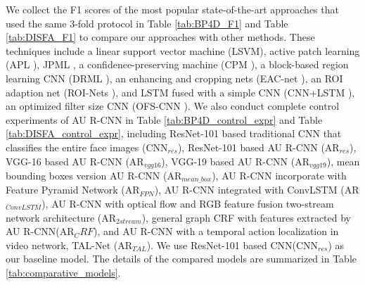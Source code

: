 \documentclass[5p,twocolumn]{elsarticle}
\begin{document}
We collect the F1 scores of the most popular state-of-the-art approaches that used the same 3-fold protocol in Table \ref{tab:BP4D_F1} and Table \ref{tab:DISFA_F1} to compare our approaches with other methods. These techniques include a linear support vector machine (LSVM), active patch learning (APL \cite{zhong2015learning}), JPML \cite{Zhao2016}, a confidence-preserving machine (CPM \cite{zeng2015confidence}), a block-based region learning CNN (DRML \cite{Zhao2016b}), an enhancing and
cropping nets (EAC-net \cite{li2017eac}), an ROI adaption net (ROI-Nets \cite{li2017action}), and LSTM fused with a simple CNN (CNN+LSTM \cite{Chu2017Learning}), an optimized filter size CNN (OFS-CNN \cite{han2017optimizing}). We also conduct complete control experiments of AU R-CNN in Table \ref{tab:BP4D_control_expr} and Table \ref{tab:DISFA_control_expr}, including ResNet-101 based traditional CNN that classifies the entire face images (CNN$_{res}$), ResNet-101 based AU R-CNN (AR$_{res}$), VGG-16 based AU R-CNN (AR$_{vgg16}$), VGG-19 based AU R-CNN (AR$_{vgg19}$), mean bounding boxes version AU R-CNN (AR$_{mean\_box}$), AU R-CNN incorporate with Feature Pyramid Network \cite{lin2017feature}(AR$_{FPN}$), AU R-CNN integrated with ConvLSTM \cite{xingjian2015convolutional} (AR$_{ConvLSTM}$),
AU R-CNN with optical flow and RGB feature fusion two-stream network architecture \cite{feichtenhofer2016convolutional}(AR$_{2stream}$), general graph CRF with features extracted by AU R-CNN(AR$_CRF$), and AU R-CNN with a temporal action localization in video network, TAL-Net \cite{chao2018rethinking}(AR$_{TAL}$). We use ResNet-101 based CNN(CNN$_{res}$) as our baseline model. The details of the compared models are summarized in Table \ref{tab:comparative_models}.
\end{document}
